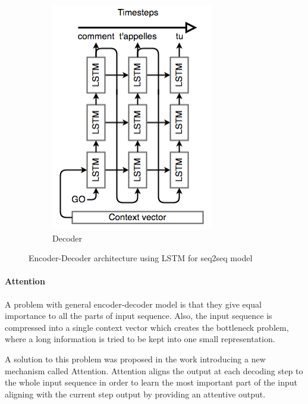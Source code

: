 \begin{figure}
\begin{subfigure}[b]{0.25\textwidth}
         \includegraphics[width=\textwidth]{images/decoder.png}
         \caption{Decoder}
         \label{fig:decoder}
     \end{subfigure}
        \caption{Encoder-Decoder architecture using LSTM for seq2seq model}
        \label{fig:enc_dec}
\end{figure}

\paragraph{Attention} A problem with general encoder-decoder model is that they give equal importance to all the parts of input sequence. Also, the input sequence is compressed into a single context vector which creates the bottleneck problem, where a long information is tried to be kept into one small representation. 

A solution to this problem was proposed in the work \cite{bahdanau2014neural} introducing a new mechanism called Attention. Attention aligns the output at each decoding step to the whole input sequence in order to learn the most important part of the input aligning with the current step output by providing an attentive output.

